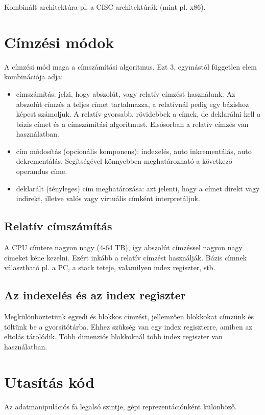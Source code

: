 Kombinált architektúra pl. a CISC architektúrák (mint pl. x86).

\section{Címzési módok}
A címzési mód maga a címszámítási algoritmus.
Ezt 3, egymástól független elem kombinációja adja:
\begin{itemize}
    \item címszámítás: jelzi, hogy abszolút, vagy relatív címzést használunk. Az abszolút címzés a teljes címet tartalmazza, a relatívnál pedig egy bázishoz képest számoljuk. A relatív gyorsabb, rövidebbek a címek, de deklarálni kell a bázis címet és a címszámítási algoritmust. Elsősorban a relatív címzés van használatban.
    \item cím módosítás (opcionális komponens): indexelés, auto inkrementálás, auto dekrementálás. Segítségével könnyebben meghatározható a következő operandus címe.
    \item deklarált (tényleges) cím meghatározása: azt jelenti, hogy a címet direkt vagy indirekt, illetve valós vagy virtuális címként interpretáljuk.
\end{itemize}

\subsection{Relatív címszámítás}
A CPU címtere nagyon nagy (4-64 TB), így abszolút címzéssel nagyon nagy címeket kéne kezelni.
Ezért inkább a relatív címzést használják.
Bázis címnek választható pl. a PC, a stack teteje, valamilyen index regiszter, stb.

\subsection{Az indexelés és az index regiszter}
Megkülönböztetünk egyedi és blokkos címzést, jellemzően blokkokat címzünk és töltünk be a gyorsítótárba.
Ehhez szükség van egy index regiszterre, amiben az eltolás tárolódik.
Több dimenziós blokkoknál több index regiszter van használatban.

\section{Utasítás kód}
Az adatmanipulációs fa legalsó szintje, gépi reprezentációnként különböző.

